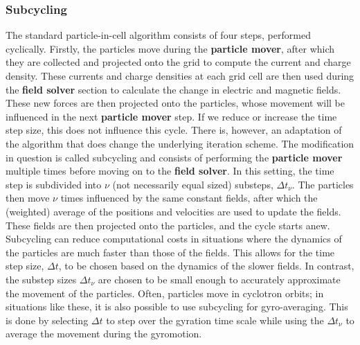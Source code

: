 \subsubsection{Subcycling}
\label{sub: subcycling}

The standard particle-in-cell algorithm consists of four steps, performed cyclically. Firstly, the particles move during the \textbf{particle mover}, after which they are collected and projected onto the grid to compute the current and charge density. These currents and charge densities at each grid cell are then used during the \textbf{field solver} section to calculate the change in electric and magnetic fields. These new forces are then projected onto the particles, whose movement will be influenced in the next \textbf{particle mover} step. If we reduce or increase the time step size, this does not influence this cycle. There is, however, an adaptation of the algorithm that does change the underlying iteration scheme. The modification in question is called subcycling and consists of performing the \textbf{particle mover} multiple times before moving on to the \textbf{field solver}. In this setting, the time step is subdivided into $\nu$ (not necessarily equal sized) substeps, $\Delta t_\nu$. The particles then move $\nu$ times influenced by the same constant fields, after which the (weighted) average of the positions and velocities are used to update the fields. These fields are then projected onto the particles, and the cycle starts anew. Subcycling can reduce computational costs in situations where the dynamics of the particles are much faster than those of the fields. This allows for the time step size, $\Delta t$, to be chosen based on the dynamics of the slower fields. In contrast, the substep sizes $\Delta t_\nu$ are chosen to be small enough to accurately approximate the movement of the particles. Often, particles move in cyclotron orbits; in situations like these, it is also possible to use subcycling for gyro-averaging. This is done by selecting $\Delta t$ to step over the gyration time scale while using the $\Delta t_\nu$ to average the movement during the gyromotion.


